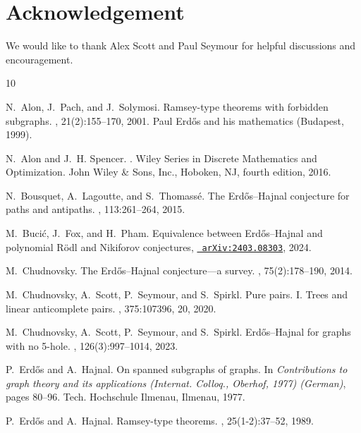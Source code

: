 \documentclass[11pt,reqno]{amsart}
\begin{document}
	\section*{Acknowledgement}
	We would like to thank Alex Scott and Paul Seymour for helpful discussions and encouragement.
	
	
	\begin{thebibliography}{10}
		
		N.~Alon, J.~Pach, and J.~Solymosi.
		\newblock Ramsey-type theorems with forbidden subgraphs.
		, 21(2):155--170, 2001.
		\newblock Paul Erd\H{o}s and his mathematics (Budapest, 1999).
		
		N.~Alon and J.~H. Spencer.
		.
		\newblock Wiley Series in Discrete Mathematics and Optimization. John Wiley \&
		Sons, Inc., Hoboken, NJ, fourth edition, 2016.
		
		N.~Bousquet, A.~Lagoutte, and S.~Thomass{\'e}.
		\newblock The {E}rd{\H o}s--{H}ajnal conjecture for paths and antipaths.
		, 113:261--264, 2015.
		
		M.~Buci{\'c}, J.~Fox, and H.~Pham.
		\newblock Equivalence between Erd{\H o}s--Hajnal and polynomial R\" odl and
		Nikiforov conjectures, \href{https://arxiv.org/abs/2403.08303}{\tt
			arXiv:2403.08303}, 2024.
		
		M.~Chudnovsky.
		\newblock The {E}rd{\H o}s--{H}ajnal conjecture---a survey.
		, 75(2):178--190, 2014.
		
		M.~Chudnovsky, A.~Scott, P.~Seymour, and S.~Spirkl.
		\newblock Pure pairs. {I}. {T}rees and linear anticomplete pairs.
		, 375:107396, 20, 2020.
		
		M.~Chudnovsky, A.~Scott, P.~Seymour, and S.~Spirkl.
		\newblock Erd{\H o}s--{H}ajnal for graphs with no 5-hole.
		, 126(3):997--1014, 2023.
		
		P.~Erd\H{o}s and A.~Hajnal.
		\newblock On spanned subgraphs of graphs.
		\newblock In {\em Contributions to graph theory and its applications
			({I}nternat. {C}olloq., {O}berhof, 1977) ({G}erman)}, pages 80--96. Tech.
		Hochschule Ilmenau, Ilmenau, 1977.
		
		P.~Erd\H{o}s and A.~Hajnal.
		\newblock Ramsey-type theorems.
		, 25(1-2):37--52, 1989.
		

\end{thebibliography}
\end{document}
